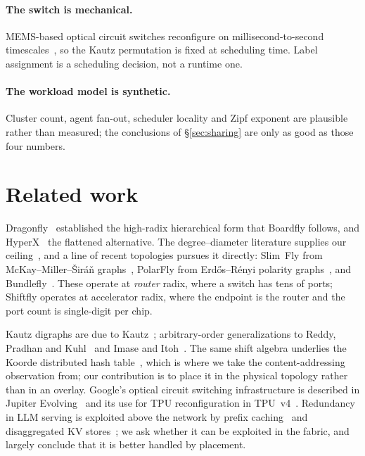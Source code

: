\documentclass[sigconf,nonacm]{acmart}
\theoremstyle{acmdefinition}%
\begin{document}
\paragraph{The switch is mechanical.} MEMS-based optical circuit switches
reconfigure on millisecond-to-second
timescales~\cite{poutievski2022jupiter,jouppi2023tpuv4}, so the Kautz
permutation is fixed at scheduling time. Label assignment is a scheduling
decision, not a runtime one.

\paragraph{The workload model is synthetic.} Cluster count, agent fan-out,
scheduler locality and Zipf exponent are plausible rather than measured; the
conclusions of \S\ref{sec:sharing} are only as good as those four numbers.

\section{Related work}

Dragonfly~\cite{kim2008dragonfly} established the high-radix hierarchical form
that Boardfly follows, and HyperX~\cite{ahn2009hyperx} the flattened
alternative. The degree--diameter literature supplies our
ceiling~\cite{hoffman1960,miller2013degdiam}, and a line of recent topologies
pursues it directly: Slim~Fly from McKay--Miller--\v{S}ir\'a\v{n}
graphs~\cite{besta2014slimfly}, PolarFly from Erd\H{o}s--R\'enyi polarity
graphs~\cite{lakhotia2022polarfly}, and Bundlefly~\cite{lei2020bundlefly}. These
operate at \emph{router} radix, where a switch has tens of ports; Shiftfly
operates at accelerator radix, where the endpoint is the router and the port
count is single-digit per chip.

Kautz digraphs are due to Kautz~\cite{kautz1968}; arbitrary-order
generalizations to Reddy, Pradhan and Kuhl~\cite{reddy1980} and Imase and
Itoh~\cite{imase1981,imase1983}. The same shift algebra underlies the Koorde
distributed hash table~\cite{kaashoek2003koorde}, which is where we take the
content-addressing observation from; our contribution is to place it in the
physical topology rather than in an overlay. Google's optical circuit switching
infrastructure is described in Jupiter Evolving~\cite{poutievski2022jupiter} and
its use for TPU reconfiguration in TPU~v4~\cite{jouppi2023tpuv4}. Redundancy in
LLM serving is exploited above the network by prefix
caching~\cite{zheng2024sglang} and disaggregated KV
stores~\cite{qin2025mooncake}; we ask whether it can be exploited in the fabric,
and largely conclude that it is better handled by placement.
\end{document}
